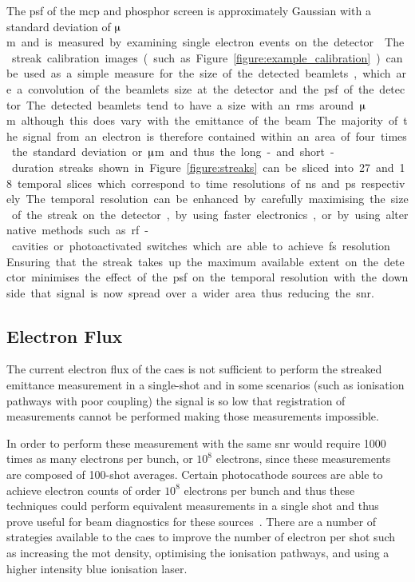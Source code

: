 The \gls{psf} of the \gls{mcp} and phosphor screen is approximately Gaussian with a standard deviation of \unit[35]{$\muup$m} and is measured by examining single electron events on the detector~\cite{speirs_electron_2017}.
The streak calibration images (such as Figure~\ref{figure:example_calibration}) can be used as a simple measure for the size of the detected beamlets, which are a convolution of the beamlets size at the detector and the \gls{psf} of the detector.
The detected beamlets tend to have a size with an \gls{rms} around \unit[183]{$\muup$m} although this does vary with the emittance of the beam.
The majority of the signal from an electron is therefore contained within an area of four times the standard deviation or \unit[732]{$\muup$m} and thus the long- and short-duration streaks shown in Figure~\ref{figure:streaks} can be sliced into 27 and 18 temporal slices which correspond to time resolutions of \unit[524]{ns} and \unit[247]{ps} respectively.

The temporal resolution can be enhanced by carefully maximising the size of the streak on the detector, by using faster electronics, or by using alternative methods such as rf-cavities or photoactivated switches which are able to achieve \unit[100]{fs} resolution~\cite{li_note:_2010,kassier_compact_2010,van_rens_theory_2018}.
Ensuring that the streak takes up the maximum available extent on the detector minimises the effect of the \gls{psf} on the temporal resolution with the downside that signal is now spread over a wider area thus reducing the \gls{snr}.

\subsection{Electron Flux}
The current electron flux of the \gls{caes} is not sufficient to perform the streaked emittance measurement in a single-shot and in some scenarios (such as ionisation pathways with poor coupling) the signal is so low that registration of measurements cannot be performed making those measurements impossible.

In order to perform these measurement with the same \gls{snr} would require 1000 times as many electrons per bunch, or $10^8$ electrons, since these measurements are composed of 100-shot averages.
Certain photocathode sources are able to achieve electron counts of order $10^8$ electrons per bunch and thus these techniques could perform equivalent measurements in a single shot and thus prove useful for beam diagnostics for these sources~\cite{li_note:_2010,musumeci_high_2010}.
There are a number of strategies available to the \gls{caes} to improve the number of electron per shot such as increasing the \gls{mot} density, optimising the ionisation pathways, and using a higher intensity blue ionisation laser.

